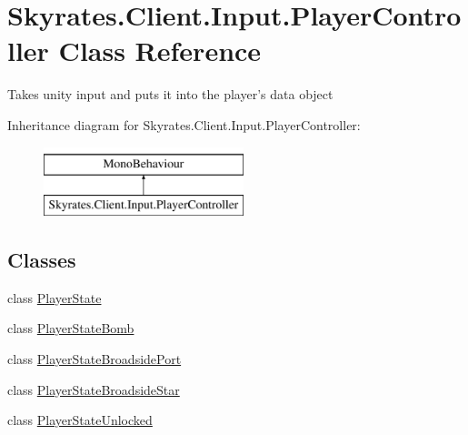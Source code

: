 \hypertarget{class_skyrates_1_1_client_1_1_input_1_1_player_controller}{\section{Skyrates.\-Client.\-Input.\-Player\-Controller Class Reference}
\label{class_skyrates_1_1_client_1_1_input_1_1_player_controller}
}


Takes unity input and puts it into the player's data object  


Inheritance diagram for Skyrates.\-Client.\-Input.\-Player\-Controller\-:\begin{figure}[H]
\begin{center}
\leavevmode
\includegraphics[height=2.000000cm]{class_skyrates_1_1_client_1_1_input_1_1_player_controller}
\end{center}
\end{figure}
\subsection*{Classes}
\begin{DoxyCompactItemize}
\item 
class \hyperlink{class_skyrates_1_1_client_1_1_input_1_1_player_controller_1_1_player_state}{Player\-State}
\item 
class \hyperlink{class_skyrates_1_1_client_1_1_input_1_1_player_controller_1_1_player_state_bomb}{Player\-State\-Bomb}
\item 
class \hyperlink{class_skyrates_1_1_client_1_1_input_1_1_player_controller_1_1_player_state_broadside_port}{Player\-State\-Broadside\-Port}
\item 
class \hyperlink{class_skyrates_1_1_client_1_1_input_1_1_player_controller_1_1_player_state_broadside_star}{Player\-State\-Broadside\-Star}
\item 
class \hyperlink{class_skyrates_1_1_client_1_1_input_1_1_player_controller_1_1_player_state_unlocked}{Player\-State\-Unlocked}
\end{DoxyCompactItemize}
